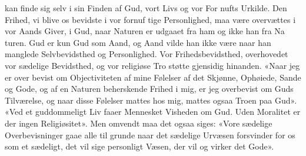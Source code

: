 \documentclass[12pt,a4paper]{book}
\begin{document}
kan finde sig selv i sin Finden af Gud, vort Livs og vor For\-%
nufts Urkilde. Den Frihed, vi blive os bevidste i vor fornuf\-%
tige Personlighed, maa være overvættes i vor Aands Giver, i
Gud, naar Naturen er udgaaet fra ham og ikke han fra Na\-%
turen. Gud er kun Gud som Aand, og Aand vilde han ikke
være naar han manglede Selvbevidsthed og Personlighed. Vor
Frihedsbevidsthed, overhovedet vor sædelige Bevidsthed, og vor
religiøse Tro støtte gjensidig hinanden. «Naar jeg er over\-%
bevist om Objectiviteten af mine Følelser af det Skjønne,
Ophøiede, Sande og Gode, og af en Naturen beherskende Frihed
i mig, er jeg overbevist om Guds Tilværelse, og naar disse
Følelser mattes hos mig, mattes ogsaa Troen paa Gud». «Ved
et guddommeligt Liv faaer Mennesket Visheden om Gud.
Uden Moralitet er der ingen Religiøsitet». Men omvendt maa
det ogsaa siges: «Vore sædelige Overbevisninger gaae alle til\-%
grunde naar det sædelige Urvæsen forsvinder for os som et
sædeligt, det vil sige personligt Væsen, der vil og virker det
Gode».
\end{document}
